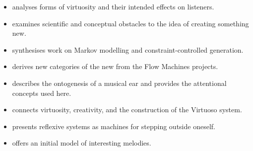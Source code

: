 \documentclass[11pt,a4paper]{article}
\begin{document}
\begin{itemize}
  \item \textcite{pachet2026virtuosite} analyses forms of virtuosity and their
        intended effects on listeners.
  \item \textcite{pachet2026impossibilite} examines scientific and conceptual
        obstacles to the idea of creating something new.
  \item \textcite{pachet2026markov} synthesises work on Markov modelling and
        constraint-controlled generation.
  \item \textcite{pachet2021assisted} derives new categories of the new from the
        Flow Machines projects.
  \item \textcite{pachet2018oreille} describes the ontogenesis of a musical ear
        and provides the attentional concepts used here.
  \item \textcite{pachet2012virtuosity} connects virtuosity, creativity, and the
        construction of the Virtuoso system.
  \item \textcite{pachet2008machines} presents reflexive systems as machines for
        stepping outside oneself.
  \item \textcite{pachet2006clefs} offers an initial model of interesting
        melodies.
\end{itemize}

\printbibliography[title={References}]
\end{document}
